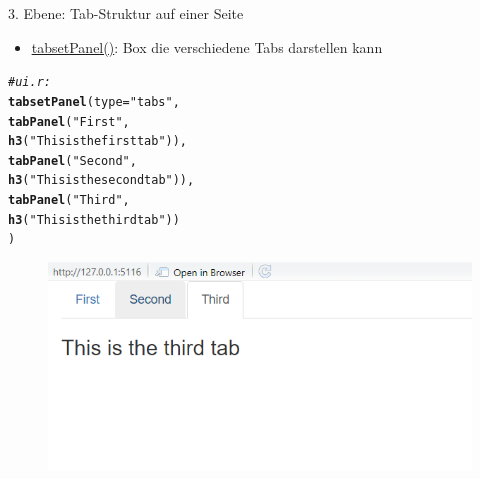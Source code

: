 \documentclass[xcolor=dvipsnames]{beamer}\usepackage[]{graphicx}\usepackage[]{color}
\makeatletter
\newcommand{\hlstr}[1]{\textcolor[rgb]{0.192,0.494,0.8}{#1}}%
\newcommand{\hlcom}[1]{\textcolor[rgb]{0.678,0.584,0.686}{\textit{#1}}}%
\newcommand{\hlstd}[1]{\textcolor[rgb]{0.345,0.345,0.345}{#1}}%
\newcommand{\hlkwc}[1]{\textcolor[rgb]{0.333,0.667,0.333}{#1}}%
\newcommand{\hlkwd}[1]{\textcolor[rgb]{0.737,0.353,0.396}{\textbf{#1}}}%
\newenvironment{kframe}{%
 \def\at@end@of@kframe{}%
 \ifinner\ifhmode%
  \def\at@end@of@kframe{\end{minipage}}%
  \begin{minipage}{\columnwidth}%
 \fi\fi%
 \def\FrameCommand##1{\hskip\@totalleftmargin \hskip-\fboxsep
 \colorbox{shadecolor}{##1}\hskip-\fboxsep
     \hskip-\linewidth \hskip-\@totalleftmargin \hskip\columnwidth}%
 \MakeFramed {\advance\hsize-\width
   \@totalleftmargin\z@ \linewidth\hsize
   \@setminipage}}%
 {\par\unskip\endMakeFramed%
 \at@end@of@kframe}
\newenvironment{knitrout}{}{} %
\makeatother
\begin{document}
\begin{frame}[fragile]{3. Ebene: Tab-Struktur auf einer Seite}
  \begin{itemize}
     \item \href{https://shiny.rstudio.com/gallery/tabsets.html}{\underline{tabsetPanel()}}: Box die verschiedene Tabs darstellen kann 
  \end{itemize}
\begin{knitrout}\small
{}\color{fgcolor}\begin{kframe}
\begin{alltt}
\hlcom{#ui.r:}
\hlkwd{tabsetPanel}\hlstd{(}\hlkwc{type} \hlstd{=} \hlstr{"tabs"}\hlstd{,}
            \hlkwd{tabPanel}\hlstd{(}\hlstr{"First"}\hlstd{,}
                     \hlkwd{h3}\hlstd{(}\hlstr{"This is the first tab"}\hlstd{)),}
            \hlkwd{tabPanel}\hlstd{(}\hlstr{"Second"}\hlstd{,}
                     \hlkwd{h3}\hlstd{(}\hlstr{"This is the second tab"}\hlstd{)),}
            \hlkwd{tabPanel}\hlstd{(}\hlstr{"Third"}\hlstd{,}
                     \hlkwd{h3}\hlstd{(}\hlstr{"This is the third tab"}\hlstd{))}
\hlstd{)}
\end{alltt}
\end{kframe}
\end{knitrout}
  \begin{figure}
  	\centering
  	\includegraphics[width=1\textwidth]{figure/tabsetPanel.png}
  \end{figure}    
\end{frame}
\end{document}
